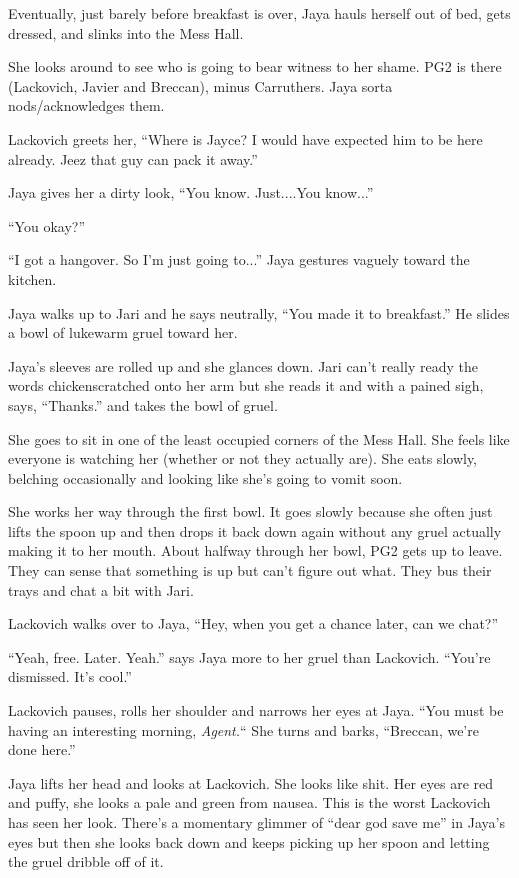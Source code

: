 Eventually, just barely before breakfast is over, Jaya hauls herself out of bed, gets dressed, and slinks into the Mess Hall.

She looks around to see who is going to bear witness to her shame.  PG2 is there (Lackovich, Javier and Breccan), minus Carruthers.  Jaya sorta nods/acknowledges them.

Lackovich greets her, ``Where is Jayce?  I would have expected him to be here already.  Jeez that guy can pack it away.''

Jaya gives her a dirty look, ``You know.  Just....You know...'' 

``You okay?''

``I got a hangover. So I'm just going to...'' Jaya gestures vaguely toward the kitchen.

Jaya walks up to Jari and he says neutrally, ``You made it to breakfast.''  He slides a bowl of lukewarm gruel toward her.

Jaya's sleeves are rolled up and she glances down.  Jari can't really ready the words chickenscratched onto her arm but she reads it and with a pained sigh, says, ``Thanks.'' and takes the bowl of gruel. 

She goes to sit in one of the least occupied corners of the Mess Hall.  She feels like everyone is watching her (whether or not they actually are).  She eats slowly, belching occasionally and looking like she's going to vomit soon.

She works her way through the first bowl.  It goes slowly because she often just lifts the spoon up and then drops it back down again without any gruel actually making it to her mouth.  About halfway through her bowl, PG2 gets up to leave.  They can sense that something is up but can't figure out what.  They bus their trays and chat a bit with Jari.

Lackovich walks over to Jaya, ``Hey, when you get a chance later, can we chat?''

``Yeah, free.  Later.  Yeah.'' says Jaya more to her gruel than Lackovich.  ``You're dismissed.  It's cool.''

Lackovich pauses, rolls her shoulder and narrows her eyes at Jaya.  ``You must be having an interesting morning, \textit{Agent.}``  She turns and barks, ``Breccan, we're done here.'' 

Jaya lifts her head and looks at Lackovich.  She looks like shit.  Her eyes are red and puffy, she looks a pale and green from nausea.  This is the worst Lackovich has seen her look.  There's a momentary glimmer of ``dear god save me'' in Jaya's eyes but then she looks back down and keeps picking up her spoon and letting the gruel dribble off of it.


